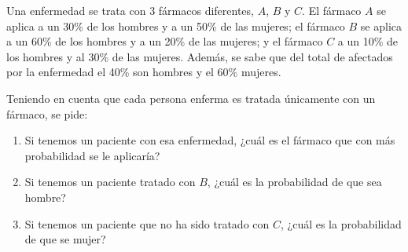 {Una enfermedad se trata con 3 fármacos diferentes, $A$, $B$ y $C$. El fármaco $A$ se aplica a un 30\% de los hombres y a un 50\% de las mujeres; el fármaco $B$ se aplica a un 60\% de los hombres y a un 20\% de las mujeres; y el fármaco $C$ a un 10\% de los hombres y al 30\% de las mujeres. Además, se sabe que del total de afectados por la enfermedad el 40\% son hombres y el 60\% mujeres.

Teniendo en cuenta que cada persona enferma es tratada únicamente con un fármaco, se pide:
\begin{enumerate}
\item Si tenemos un paciente con esa enfermedad, ¿cuál es el fármaco que con más probabilidad se le aplicaría?
\item Si tenemos un paciente tratado con $B$, ¿cuál es la probabilidad de que sea hombre?
\item Si tenemos un paciente que no ha sido tratado con $C$, ¿cuál es la probabilidad de que se mujer?
\end{enumerate}
}
{}
{}


